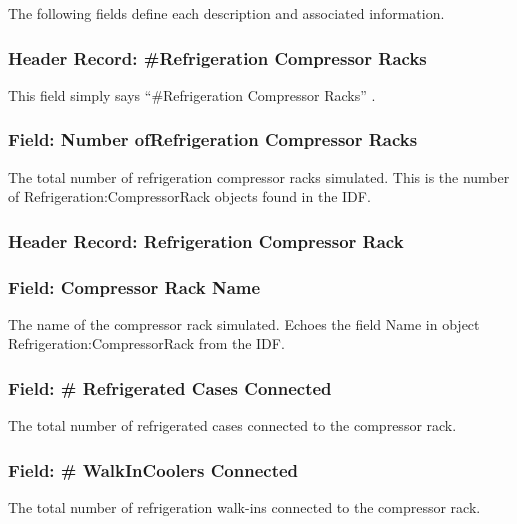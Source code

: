 The following fields define each description and associated information.

\subsubsection{Header Record: \#Refrigeration Compressor Racks}\label{header-record-refrigeration-compressor-racks}

This field simply says ``\#Refrigeration Compressor Racks'' .

\subsubsection{Field: Number ofRefrigeration Compressor Racks}\label{field-number-ofrefrigeration-compressor-racks}

The total number of refrigeration compressor racks simulated. This is the number of Refrigeration:CompressorRack objects found in the IDF.

\subsubsection{Header Record: Refrigeration Compressor Rack}\label{header-record-refrigeration-compressor-rack}

\subsubsection{Field: Compressor Rack Name}\label{field-compressor-rack-name}

The name of the compressor rack simulated. Echoes the field Name in object Refrigeration:CompressorRack from the IDF.

\subsubsection{Field: \# Refrigerated Cases Connected}\label{field-refrigerated-cases-connected}

The total number of refrigerated cases connected to the compressor rack.

\subsubsection{Field: \# WalkInCoolers Connected}\label{field-walkincoolers-connected}

The total number of refrigeration walk-ins connected to the compressor rack.

